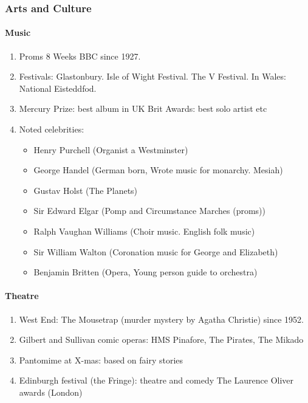 \documentclass[10pt,reqno]{amsart}
\begin{document}
\subsubsection{Arts and Culture}

\paragraph{Music}

\begin{enumerate}[i]
\item Proms 8 Weeks BBC since 1927.
\item Festivals: Glastonbury. Isle of Wight Festival. The V Festival. 
In Wales: National Eisteddfod. 
\item Mercury Prize: best album in UK
Brit Awards: best solo artist etc
\item Noted celebrities:
\begin{itemize}
\item Henry Purchell (Organist a Westminster)
\item George Handel (German born, Wrote music for monarchy. Mesiah)
 \item Gustav Holst (The Planets)
\item Sir Edward Elgar (Pomp and Circumstance Marches (proms))
\item Ralph Vaughan Williams (Choir music. English folk music)
\item Sir William Walton (Coronation music for George and Elizabeth)
\item Benjamin Britten (Opera, Young person guide to orchestra)
\end{itemize}
\end{enumerate}

\paragraph{Theatre}

\begin{enumerate}[i]
\item West End: The Mousetrap (murder mystery by Agatha Christie) since 1952.
\item Gilbert and Sullivan comic operas: HMS Pinafore, The Pirates, The Mikado
\item Pantomime at X-mas: based on fairy stories 
\item Edinburgh festival (the Fringe): theatre and comedy
The Laurence Oliver awards (London)
\end{enumerate}
\end{document}
